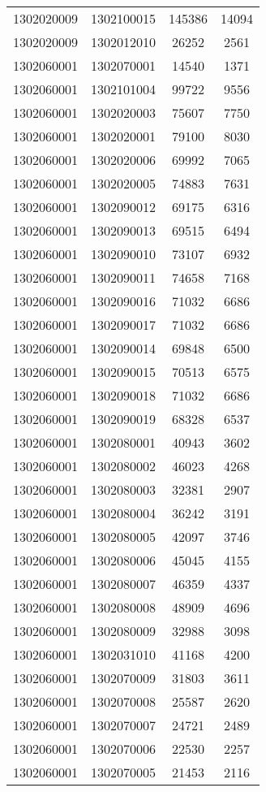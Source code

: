 \begin{longtable}{llcc}
1302020009 & 1302100015 & 145386 & 14094\\
1302020009 & 1302012010 & 26252 & 2561\\
1302060001 & 1302070001 & 14540 & 1371\\
1302060001 & 1302101004 & 99722 & 9556\\
1302060001 & 1302020003 & 75607 & 7750\\
1302060001 & 1302020001 & 79100 & 8030\\
1302060001 & 1302020006 & 69992 & 7065\\
1302060001 & 1302020005 & 74883 & 7631\\
1302060001 & 1302090012 & 69175 & 6316\\
1302060001 & 1302090013 & 69515 & 6494\\
1302060001 & 1302090010 & 73107 & 6932\\
1302060001 & 1302090011 & 74658 & 7168\\
1302060001 & 1302090016 & 71032 & 6686\\
1302060001 & 1302090017 & 71032 & 6686\\
1302060001 & 1302090014 & 69848 & 6500\\
1302060001 & 1302090015 & 70513 & 6575\\
1302060001 & 1302090018 & 71032 & 6686\\
1302060001 & 1302090019 & 68328 & 6537\\
1302060001 & 1302080001 & 40943 & 3602\\
1302060001 & 1302080002 & 46023 & 4268\\
1302060001 & 1302080003 & 32381 & 2907\\
1302060001 & 1302080004 & 36242 & 3191\\
1302060001 & 1302080005 & 42097 & 3746\\
1302060001 & 1302080006 & 45045 & 4155\\
1302060001 & 1302080007 & 46359 & 4337\\
1302060001 & 1302080008 & 48909 & 4696\\
1302060001 & 1302080009 & 32988 & 3098\\
1302060001 & 1302031010 & 41168 & 4200\\
1302060001 & 1302070009 & 31803 & 3611\\
1302060001 & 1302070008 & 25587 & 2620\\
1302060001 & 1302070007 & 24721 & 2489\\
1302060001 & 1302070006 & 22530 & 2257\\
1302060001 & 1302070005 & 21453 & 2116\\

\end{longtable}
